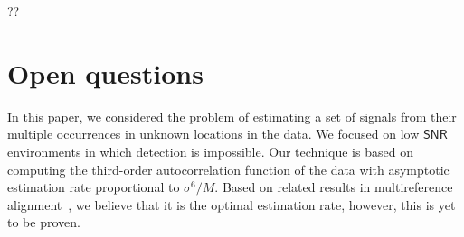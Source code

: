 \documentclass[english,11pt]{article}
\numberwithin{equation}{section}
\theoremstyle{plain}
\theoremstyle{definition}
\theoremstyle{remark}
\theoremstyle{plain}
\theoremstyle{remark}
\theoremstyle{plain}
\theoremstyle{plain}
\newcommand{\SNR}{{\textsf{SNR}}}
\begin{document}
?? 

%
%
% 

\section{Open questions}

In this paper, we considered the problem of estimating a set of signals from their multiple occurrences in unknown locations in the data.  We focused on  low $\SNR$ environments in which detection is impossible. 
Our technique  is based on computing the third-order autocorrelation function of the data with asymptotic estimation rate proportional to $\sigma^6/M$. Based on related results in multireference alignment~\cite{abbe2018estimation}, we believe that it is the optimal estimation rate, however, this is yet to be proven.
\end{document}
